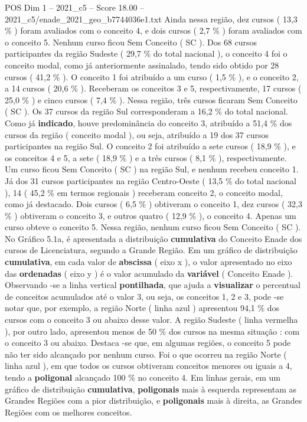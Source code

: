 \begin{textsample}{POS Dim 1 – 2021\_c5 – Score 18.00 – 2021\_c5/enade\_2021\_geo\_b7744036e1.txt}
Ainda nessa região, dez cursos ( 13,3 \% ) foram avaliados com o conceito 4, e dois cursos ( 2,7 \% ) foram avaliados com o conceito 5.
Nenhum curso ficou Sem Conceito ( SC ).
Dos 68 cursos participantes da região Sudeste ( 29,7 \% do total nacional ), o conceito 4 foi o conceito modal, como já anteriormente assinalado, tendo sido obtido por 28 cursos ( 41,2 \% ).
O conceito 1 foi atribuído a um curso ( 1,5 \% ), e o conceito 2, a 14 cursos ( 20,6 \% ).
Receberam os conceitos 3 e 5, respectivamente, 17 cursos ( 25,0 \% ) e cinco cursos ( 7,4 \% ).
Nessa região, três cursos ficaram Sem Conceito ( SC ).
Os 37 cursos da região Sul corresponderam a 16,2 \% do total nacional.
Como já \textbf{indicado}, houve predominância do conceito 3, atribuído a 51,4 \% dos cursos da região ( conceito modal ), ou seja, atribuído a 19 dos 37 cursos participantes na região Sul.
O conceito 2 foi atribuído a sete cursos ( 18,9 \% ), e os conceitos 4 e 5, a sete ( 18,9 \% ) e a três cursos ( 8,1 \% ), respectivamente.
Um curso ficou Sem Conceito ( SC ) na região Sul, e nenhum recebeu conceito 1.
Já dos 31 cursos participantes na região Centro-Oeste ( 13,5 \% do total nacional ), 14 ( 45,2 \% em termos regionais ) receberam conceito 2, o conceito modal, como já destacado.
Dois cursos ( 6,5 \% ) obtiveram o conceito 1, dez cursos ( 32,3 \% ) obtiveram o conceito 3, e outros quatro ( 12,9 \% ), o conceito 4.
Apenas um curso obteve o conceito 5.
Nessa região, nenhum curso ficou Sem Conceito ( SC ).
No Gráfico 5.1a, é apresentada a distribuição \textbf{cumulativa} do Conceito Enade dos cursos de Licenciatura, segundo a Grande Região.
Em um gráfico de distribuição \textbf{cumulativa}, em cada valor de \textbf{abscissa} ( eixo x ), o valor apresentado no eixo das \textbf{ordenadas} ( eixo y ) é o valor acumulado da \textbf{variável} ( Conceito Enade ).
Observando -se a linha vertical \textbf{pontilhada}, que ajuda a \textbf{visualizar} o percentual de conceitos acumulados até o valor 3, ou seja, os conceitos 1, 2 e 3, pode -se notar que, por exemplo, a região Norte ( linha azul ) apresentou 94,1 \% dos cursos com o conceito 3 ou abaixo desse valor.
A região Sudeste ( linha vermelha ), por outro lado, apresentou menos de 50 \% dos cursos na mesma situação : com o conceito 3 ou abaixo.
Destaca -se que, em algumas regiões, o conceito 5 pode não ter sido alcançado por nenhum curso.
Foi o que ocorreu na região Norte ( linha azul ), em que todos os cursos obtiveram conceitos menores ou iguais a 4, tendo a \textbf{poligonal} alcançado 100 \% no conceito 4.
Em linhas gerais, em um gráfico de distribuição \textbf{cumulativa}, \textbf{poligonais} mais à esquerda representam as Grandes Regiões com a pior distribuição, e \textbf{poligonais} mais à direita, as Grandes Regiões com os melhores conceitos.

\end{textsample}
